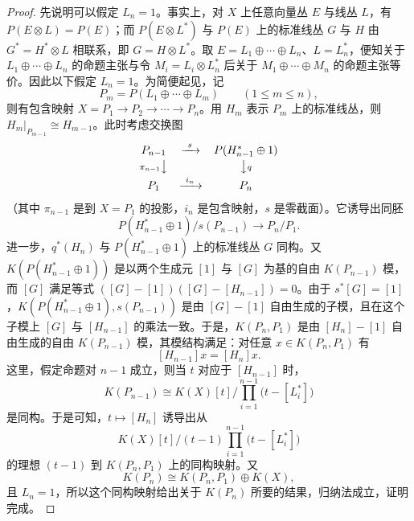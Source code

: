 \begin{proof}
  先说明可以假定 $L_n=1$。事实上，对 $X$ 上任意向量丛 $E$ 与线丛 $L$，有 $P(E\otimes L)=P(E)$；而 $P(E\otimes L^*)$ 与 $P(E)$ 上的标准线丛 $G$ 与 $H$ 由 $G^*=H^*\otimes L$ 相联系，即 $G=H\otimes L^*$。取 $E=L_1\oplus\cdots\oplus L_n$、$L=L_n^*$，便知关于 $L_1\oplus\cdots\oplus L_n$ 的命题主张与令 $M_i=L_i\otimes L_n^*$ 后关于 $M_1\oplus\cdots\oplus M_n$ 的命题主张等价。因此以下假定 $L_n=1$。为简便起见，记
  \[
  P_m=P(L_1\oplus\cdots\oplus L_m)\qquad(1\le m\le n),
  \]
  则有包含映射 $X=P_1\to P_2\to\cdots\to P_n$。用 $H_m$ 表示 $P_m$ 上的标准线丛，则 $H_m|_{P_{m-1}}\cong H_{m-1}$。此时考虑交换图
  \[
  \begin{array}{ccc}
  P_{n-1} & \xrightarrow{\ s\ } & P(H_{n-1}^*\oplus1)\\[2pt]
  {\scriptstyle\pi_{n-1}}\big\downarrow & & \big\downarrow{\scriptstyle q}\\[2pt]
  P_1 & \xrightarrow{\ i_n\ } & P_n
  \end{array}
  \]
  （其中 $\pi_{n-1}$ 是到 $X=P_1$ 的投影，$i_n$ 是包含映射，$s$ 是零截面）。它诱导出同胚
  \[
  P(H_{n-1}^*\oplus1)/s(P_{n-1})\longrightarrow P_n/P_1.
  \]
  进一步，$q^*(H_n)$ 与 $P(H_{n-1}^*\oplus1)$ 上的标准线丛 $G$ 同构。又 $K(P(H_{n-1}^*\oplus1))$ 是以两个生成元 $[1]$ 与 $[G]$ 为基的自由 $K(P_{n-1})$ 模，而 $[G]$ 满足等式 $([G]-[1])([G]-[H_{n-1}])=0$。由于 $s^*[G]=[1]$，$K(P(H_{n-1}^*\oplus1),s(P_{n-1}))$ 是由 $[G]-[1]$ 自由生成的子模，且在这个子模上 $[G]$ 与 $[H_{n-1}]$ 的乘法一致。于是，$K(P_n,P_1)$ 是由 $[H_n]-[1]$ 自由生成的自由 $K(P_{n-1})$ 模，其模结构满足：对任意 $x\in K(P_n,P_1)$ 有
  \[
  [H_{n-1}]x=[H_n]x.
  \]
  这里，假定命题对 $n-1$ 成立，则当 $t$ 对应于 $[H_{n-1}]$ 时，
  \[
  K(P_{n-1})\cong K(X)[t]\Big/\prod_{i=1}^{n-1}\bigl(t-[L_i^*]\bigr)
  \]
  是同构。于是可知，$t\mapsto[H_n]$ 诱导出从
  \[
  K(X)[t]\Big/(t-1)\prod_{i=1}^{n-1}\bigl(t-[L_i^*]\bigr)
  \]
  的理想 $(t-1)$ 到 $K(P_n,P_1)$ 上的同构映射。又
  \[
  K(P_n)\cong K(P_n,P_1)\oplus K(X),
  \]
  且 $L_n=1$，所以这个同构映射给出关于 $K(P_n)$ 所要的结果，归纳法成立，证明完成。
\end{proof}

